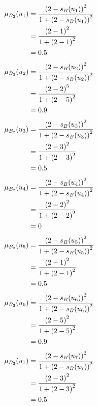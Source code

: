 \documentclass[a4paper,openany]{book}
\begin{document}
				\begin{align}
					\mu_{B_2}(u_1) &= \frac{\left(2-s_B(u_1)\right)^2}{1 + \left(2-s_B(u_1)\right)^2}\\
					&= \frac{\left(2-1\right)^2}{1 + \left(2-1\right)^2} \notag \\
					&= 0.5 \notag
				\end{align}
				\begin{align}
					\mu_{B_2}(u_2) &= \frac{\left(2-s_B(u_2)\right)^2}{1 + \left(2-s_B(u_2)\right)^2}\\
					&= \frac{\left(2-2\right)^5}{1 + \left(2-5\right)^2} \notag \\
					&= 0.9 \notag
				\end{align}
				\begin{align}
					\mu_{B_2}(u_3) &= \frac{\left(2-s_B(u_3)\right)^2}{1 + \left(2-s_B(u_3)\right)^2}\\
					&= \frac{\left(2-3\right)^2}{1 + \left(2-3\right)^2} \notag \\
					&= 0.5 \notag
				\end{align}
				\begin{align}
					\mu_{B_2}(u_4) &= \frac{\left(2-s_B(u_4)\right)^2}{1 + \left(2-s_B(u_4)\right)^2}\\
					&= \frac{\left(2-2\right)^2}{1 + \left(2-2\right)^2} \notag \\
					&= 0 \notag
				\end{align}
				\begin{align}
					\mu_{B_2}(u_5) &= \frac{\left(2-s_B(u_5)\right)^2}{1 + \left(2-s_B(u_5)\right)^2}\\
					&= \frac{\left(2-1\right)^2}{1 + \left(2-1\right)^2} \notag \\
					&= 0.5 \notag
				\end{align}
				\begin{align}
					\mu_{B_2}(u_6) &= \frac{\left(2-s_B(u_6)\right)^2}{1 + \left(2-s_B(u_6)\right)^2}\\
					&= \frac{\left(2-5\right)^2}{1 + \left(2-5\right)^2} \notag \\
					&= 0.9 \notag
				\end{align}
				\begin{align}
					\mu_{B_2}(u_7) &= \frac{\left(2-s_B(u_7)\right)^2}{1 + \left(2-s_B(u_7)\right)^2}\\
					&= \frac{\left(2-3\right)^2}{1 + \left(2-3\right)^2} \notag \\
					&= 0.5 \notag
				\end{align}
\end{document}
